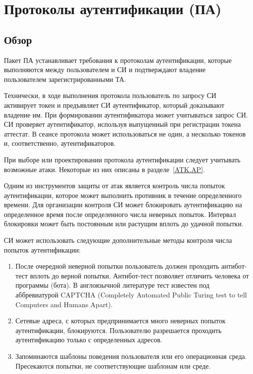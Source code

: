 \section{Протоколы аутентификации (ПА)}\label{AP}

\subsection{Обзор}\label{AP.Intro}

Пакет ПА устанавливает требования к протоколам аутентификации,
которые выполняются между пользователем и СИ и подтверждают владение
пользователем зарегистрированными ТА.

Технически, в ходе выполнения протокола пользователь по запросу 
СИ активирует токен и предъявляет СИ аутентификатор, который доказывают 
владение им. При формировании аутентификатора может учитываться запрос СИ. 
СИ проверяет аутентификатор, используя выпущенный при регистрации токена 
аттестат.
%
В сеансе протокола может использоваться не один, а несколько токенов и,
соответственно, аутентификаторов.

При выборе или проектировании протокола аутентификации следует учитывать 
возможные атаки. Некоторые из них описаны в разделе~\ref{ATK.AP}. 

Одним из инструментов защиты от атак является контроль числа попыток 
аутентификации, которое может выполнить противник в течение определенного 
времени. Для организации контроля СИ может блокировать аутентификацию на 
определенное время после определенного числа неверных попыток. Интервал 
блокировки может быть постоянным или растущим вплоть до удачной попытки. 

СИ может использовать следующие дополнительные методы контроля числа
попыток аутентификации:
\begin{enumerate}
\item
После очередной неверной попытки пользователь должен проходить антибот-тест 
вплоть до верной попытки. Антибот-тест позволяет отличить человека от 
программы (бота). В англоязычной литературе тест известен под 
аббревиатурой CAPTCHA (Completely Automated Public Turing test to tell 
Computers and Humans Apart). 

\item
Сетевые адреса, с которых предпринимается много неверных попыток 
аутентификации, блокируются. Пользователю разрешается проходить аутентификацию 
только с определенных адресов.

\item
Запоминаются шаблоны поведения пользователя или его операционная среда. 
Пресекаются попытки, не соответствующие шаблонам или среде.
\end{enumerate}

